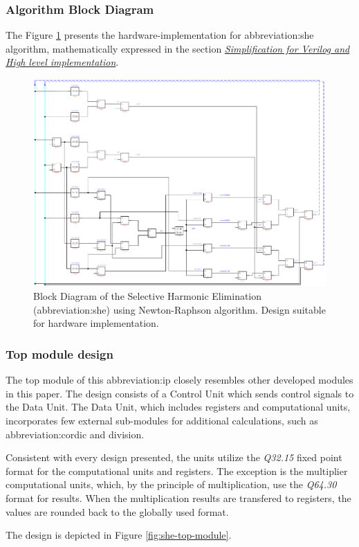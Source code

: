 \documentclass[a4paper, twoside, 11pt]{article}
\begin{document}
        \subsubsection{Algorithm Block Diagram}\label{subsubsec:algorithm-block-design}
            The Figure \ref{fig:she-overview} presents the hardware-implementation for \gls{abbreviation:she} algorithm, mathematically expressed in the section \hyperref[subsec:simplification-for-verilog-and-high-level-implementation]{\textit{Simplification for Verilog and High level implementation}}.
            \begin{figure}[htbp!]
                \centering
                \includegraphics[width=1\textwidth]{src/pdf/she-overview.pdf}
                \caption{Block Diagram of the Selective Harmonic Elimination (\gls{abbreviation:she}) using Newton-Raphson algorithm. Design suitable for hardware implementation.}
                \label{fig:she-overview}
            \end{figure}

    \FloatBarrier
        \subsubsection{Top module design}
            The top module of this \gls{abbreviation:ip} closely resembles other developed modules in this paper. The design consists of a Control Unit which sends control signals to the Data Unit. The Data Unit, which includes registers and computational units, incorporates few external sub-modules for additional calculations, such as \gls{abbreviation:cordic} and division.\par
            Consistent with every design presented, the units utilize the \textit{Q32.15} fixed point format for the computational units and registers. The exception is the multiplier computational units, which, by the principle of multiplication, use the \textit{Q64.30} format for results. When the multiplication results are transfered to registers, the values are rounded back to the globally used format.\par
            The design is depicted in Figure \ref{fig:she-top-module}.
\end{document}
